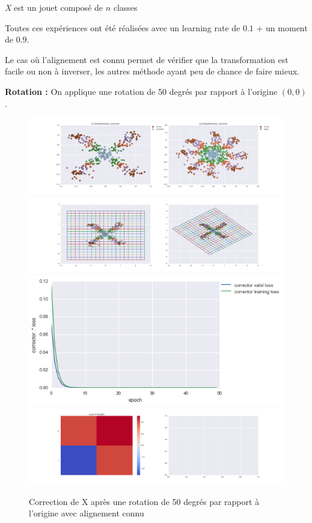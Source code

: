 

\emph{X} est un jouet composé de $n$ classes 

Toutes ces expériences ont été réalisées avec un learning rate de $0.1$ + un moment de $0.9$.


Le cas où l'alignement est connu permet de vérifier que la transformation est facile ou non 
à inverser, les autres méthode ayant peu de chance de faire mieux.

{\Large \textbf{Rotation :}} On applique une rotation de 50 degrés par rapport à l'origine $(0,0)$.

\begin{figure}[H] %
\centering
\includegraphics[width=\linewidth]{fig/24-05-2016/X/X_RotatedPairwise_Corrector-DATA.png}
\includegraphics[width=\linewidth]{fig/24-05-2016/X/X_RotatedPairwise_Corrector-GridCheck.png}
\includegraphics[width=0.45\linewidth]{fig/24-05-2016/X/X_RotatedPairwise_Corrector-Learning_curve.png}
\includegraphics[width=\linewidth]{fig/24-05-2016/X/X_RotatedPairwise_Corrector-W.png}
\caption{Correction de X après une rotation de 50 degrés par rapport à l'origine avec alignement connu}
\label{fig:recap-X-rot-pairwise}
\end{figure}

